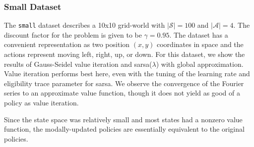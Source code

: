 \documentclass[10pt,letterpaper]{article}
\begin{document}
\begin{multicols*}{2}
	\subsubsection*{\sf \textbf{Small Dataset}}
	
	The \texttt{small} dataset describes a 10x10 grid-world with $|\mathcal{S}| = 100$ and $|\mathcal{A}| = 4$. The discount factor for the problem is given to be $\gamma = 0.95$. The dataset has a convenient representation as two position $(x,y)$ coordinates in space and the actions represent moving left, right, up, or down. For this dataset, we show the results of Gauss-Seidel value iteration and sarsa($\lambda$) with global approximation. Value iteration performs best here, even with the tuning of the learning rate and eligibility trace parameter for sarsa. We observe the convergence of the Fourier series to an approximate value function, though it does not yield as good of a policy as value iteration.
	
	Since the state space was relatively small and most states had a nonzero value function, the modally-updated policies are essentially equivalent to the original policies.
	

\end{multicols*}
\end{document}
